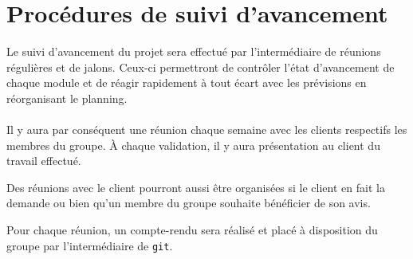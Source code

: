 \documentclass[a4paper,11pt,french]{article}
\begin{document}
\section{Procédures de suivi d'avancement}
Le suivi d'avancement du projet sera effectué par l'intermédiaire de réunions
régulières et de jalons. Ceux-ci permettront de contrôler l'état d'avancement
de chaque module et de réagir rapidement à tout écart avec les prévisions en
réorganisant le planning.

\paragraph{}
Il y aura par conséquent une réunion chaque semaine avec les clients respectifs
les membres du groupe. À chaque validation, il y aura présentation au client du 
travail effectué.

Des réunions avec le client pourront aussi être organisées si le client en fait
la demande ou bien qu'un membre du groupe souhaite bénéficier de son avis.

Pour chaque réunion, un compte-rendu sera réalisé et placé à disposition du
groupe par l'intermédiaire de \texttt{git}.
\end{document}
